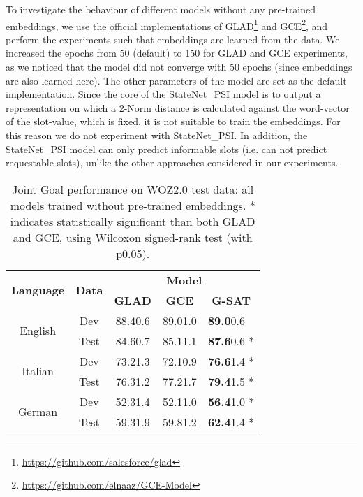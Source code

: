 \documentclass{article}
\begin{document}
To investigate the behaviour of different models  without any pre-trained embeddings, we use the official implementations of GLAD\footnote{\url{https://github.com/salesforce/glad}} and GCE\footnote{\url{https://github.com/elnaaz/GCE-Model}}, and perform the experiments such that embeddings are learned from the data.
We increased the epochs from 50 (default) to 150 for GLAD and GCE experiments, as we noticed that the model did not converge with 50 epochs (since embeddings are also learned here).
The other parameters of the model are set as the default implementation.
Since the core of the StateNet\_PSI model is to output a representation on which a 2-Norm distance is calculated against the word-vector of the slot-value, which is fixed, it is not suitable to train the embeddings.
For this reason we do not experiment with StateNet\_PSI.
In addition, the StateNet\_PSI model can only predict informable slots (i.e. can not predict requestable slots), unlike the other approaches considered in our experiments.

\begin{table}
    \centering
    \begin{tabular}{c|c|c|c|l}
        \multirow{2}{*}{\textbf{Language}} & \multirow{2}{*}{\textbf{Data}} & \multicolumn{3}{c}{\textbf{Model}}\\
& & \textbf{GLAD} & \textbf{GCE} & \multicolumn{1}{c}{\textbf{G-SAT}}\\
        \hline
        \multirow{2}{*}{English} &  Dev & 88.40.6 & 89.01.0 & \textbf{89.0}0.6 \\
        \cline{2-5}
        & Test & 84.60.7 & 85.11.1 & \textbf{87.6}0.6 * \\
        \hline
        \multirow{2}{*}{Italian} &  Dev & 73.21.3 & 72.10.9 & \textbf{76.6}1.4 * \\
        \cline{2-5}
        & Test & 76.31.2 & 77.21.7 & \textbf{79.4}1.5 * \\
        \hline
        \multirow{2}{*}{German} &  Dev & 52.31.4 & 52.11.0 & \textbf{56.4}1.0 * \\
        \cline{2-5}
        & Test & 59.31.9 & 59.81.2 & \textbf{62.4}1.4 * \\
        \hline
    \end{tabular}
    \caption{Joint Goal performance on WOZ2.0 test data: all models trained without pre-trained embeddings. * indicates statistically significant \cite{reimers-gurevych-2017-reporting} than both GLAD and GCE, using Wilcoxon signed-rank test (with p0.05).}
    \label{tab:result}
\end{table}
\end{document}
